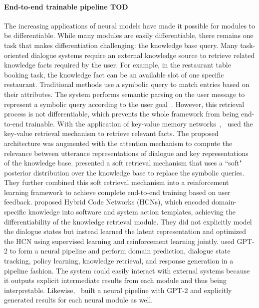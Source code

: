 \paragraph*{End-to-end trainable pipeline TOD} The increasing applications of neural models have made it possible for modules to be differentiable. While many modules are easily differentiable, there remains one task that makes differentiation challenging: the knowledge base query. Many task-oriented dialogue systems require an external knowledge source to retrieve related knowledge facts required by the user. For example, in the restaurant table booking task, the knowledge fact can be an available slot of one specific restaurant. Traditional methods use a symbolic query to match entries based on their attributes. The system performs semantic parsing on the user message to represent a symbolic query according to the user goal~. However, this retrieval process is not differentiable, which prevents the whole framework from being end-to-end trainable. With the application of key-value memory networks~,~ used the key-value retrieval mechanism to retrieve relevant facts. The proposed architecture was augmented with the attention mechanism to compute the relevance between utterance representations of dialogue and key representations of the knowledge base.  presented a soft retrieval mechanism that uses a ``soft" posterior distribution over the knowledge base to replace the symbolic queries. They further combined this soft retrieval mechanism into a reinforcement learning framework to achieve complete end-to-end training based on user feedback.  proposed Hybrid Code Networks (HCNs), which encoded domain-specific knowledge into software and system action templates, achieving the differentiability of the knowledge retrieval module. They did not explicitly model the dialogue states but instead learned the latent representation and optimized the HCN using supervised learning and reinforcement learning jointly.  used GPT-2 to form a neural pipeline and perform domain prediction, dialogue state tracking, policy learning, knowledge retrieval, and response generation in a pipeline fashion. The system could easily interact with external systems because it outputs explicit intermediate results from each module and thus being interpretable. Likewise,~ built a neural pipeline with GPT-2 and explicitly generated results for each neural module as well. 
